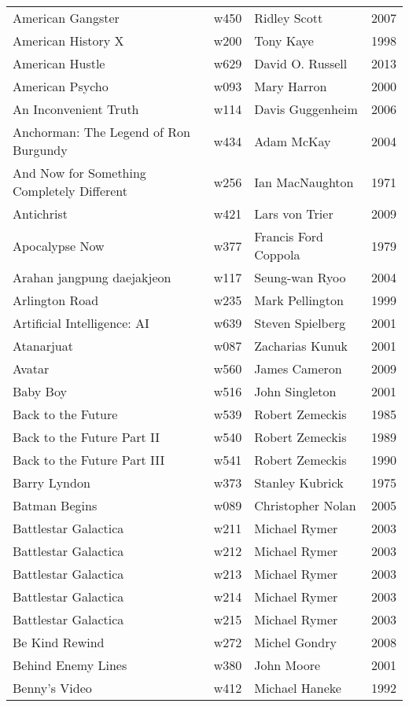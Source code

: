 \documentclass{article}
\begin{document}
\begin {center}
\begin{longtable}{p{10cm} l l l}
American Gangster & w450 & Ridley Scott & 2007 \\
American History X & w200 & Tony Kaye & 1998 \\
American Hustle & w629 & David O. Russell & 2013 \\
American Psycho & w093 & Mary Harron & 2000 \\
An Inconvenient Truth & w114 & Davis Guggenheim & 2006 \\
Anchorman: The Legend of Ron Burgundy & w434 & Adam McKay & 2004 \\
And Now for Something Completely Different & w256 & Ian MacNaughton & 1971 \\
Antichrist & w421 & Lars von Trier & 2009 \\
Apocalypse Now & w377 & Francis Ford Coppola & 1979 \\
Arahan jangpung daejakjeon & w117 & Seung-wan Ryoo & 2004 \\
Arlington Road & w235 & Mark Pellington & 1999 \\
Artificial Intelligence: AI & w639 & Steven Spielberg & 2001 \\
Atanarjuat & w087 & Zacharias Kunuk & 2001 \\
Avatar & w560 & James Cameron & 2009 \\
Baby Boy & w516 & John Singleton & 2001 \\
Back to the Future & w539 & Robert Zemeckis & 1985 \\
Back to the Future Part II & w540 & Robert Zemeckis & 1989 \\
Back to the Future Part III & w541 & Robert Zemeckis & 1990 \\
Barry Lyndon & w373 & Stanley Kubrick & 1975 \\
Batman Begins & w089 & Christopher Nolan & 2005 \\
Battlestar Galactica & w211 & Michael Rymer & 2003 \\
Battlestar Galactica & w212 & Michael Rymer & 2003 \\
Battlestar Galactica & w213 & Michael Rymer & 2003 \\
Battlestar Galactica & w214 & Michael Rymer & 2003 \\
Battlestar Galactica & w215 & Michael Rymer & 2003 \\
Be Kind Rewind & w272 & Michel Gondry & 2008 \\
Behind Enemy Lines & w380 & John Moore & 2001 \\
Benny's Video & w412 & Michael Haneke & 1992 \\

\end{longtable}
\end{center}
\end{document}
